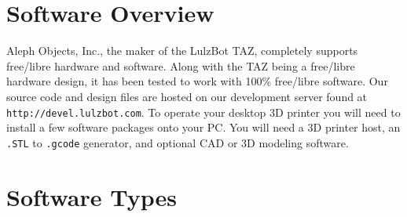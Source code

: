 %
%
%
%
%

\section{Software Overview}

Aleph Objects, Inc., the maker of the LulzBot\textsuperscript{\miniscule{\texttrademark}} TAZ, completely supports free/libre hardware and software. Along with the TAZ being a free/libre hardware design, it has been tested to work with 100\% free/libre software. Our source code and design files are hosted on our development server found at \texttt{http://devel.lulzbot.com}.
To operate your desktop 3D printer you will need to install a few software packages onto your PC. You will need a 3D printer host, an \texttt{.STL} to \texttt{.gcode} generator, and optional CAD or 3D modeling software.

\section{Software Types}

